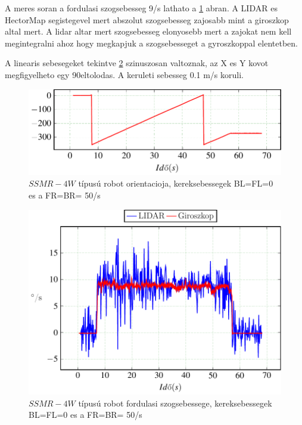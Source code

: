 A meres soran a fordulasi szogsebesseg 9\degree/s lathato a \ref{fig:Left0Right50c} abran. A LIDAR es HectorMap segistegevel mert abszolut szogsebesseg zajosabb mint a giroszkop altal mert. A lidar altar mert szogsebesseg elonyosebb mert a zajokat nem kell megintegralni ahoz hogy megkapjuk a szogsebesseget a gyroszkoppal elentetben.

A linearis sebesegeket tekintve \ref{fig:Left0Right50d} szinuszosan valtoznak, az X es Y kovot megfigyelheto egy 90\degree eltolodas. A keruleti sebesseg 0.1 m/s koruli.

\begin{figure}[H]
  \includegraphics{tikz/Left0Right50c.pdf}
  \caption{$SSMR-4W$ típusú robot orientacioja, kereksebessegek BL=FL=0 es a FR=BR= 50\degree/s}
  \label{fig:Left0Right50c}
\end{figure}


\begin{figure}[H]
  \label{fig:Left0Right50d}
  \includegraphics{tikz/Left0Right50d.pdf}
  \caption{$SSMR-4W$ típusú robot fordulasi szogsebessege, kereksebessegek BL=FL=0 es a FR=BR= 50\degree/s}
  \label{fig:Left0Right50d}
\end{figure}


